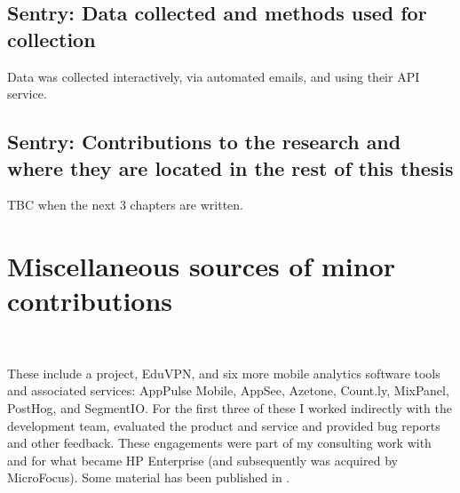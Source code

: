 \subsection{Sentry: Data collected and methods used for collection}

Data was collected interactively, via automated emails, and using their API service.

\subsection{Sentry: Contributions to the research and where they are located in the rest of this thesis}
TBC when the next 3 chapters are written.




\section{Miscellaneous sources of minor contributions}~\label{section-case-study-misc-contributions}

These include a project, EduVPN, and six more mobile analytics software tools and associated services: AppPulse Mobile, AppSee, Azetone, Count.ly, MixPanel, PostHog, and SegmentIO. For the first three of these I worked indirectly with the development team, evaluated the product and service and provided bug reports and other feedback. These engagements were part of my consulting work with and for what became HP Enterprise (and subsequently was acquired by MicroFocus). Some material has been published in .

